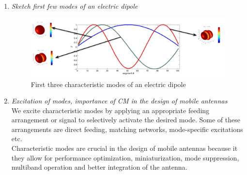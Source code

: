 \documentclass[11pt,a4paper]{article}
\begin{document}
\begin{enumerate}
    \item \emph{Sketch first few modes of an electric dipole}
    \begin{figure}[!ht]
        \centering
        \includegraphics[width=.9\textwidth]{src/characteristic-modes-dipole.png}
        \caption{\label{fig:characteristic-modes-dipole}First three characteristic modes of an electric dipole}
    \end{figure}
    \item \emph{Excitation of modes, importance of CM in the design of mobile antennas}\\
    We excite characteristic modes by applying an appropriate feeding arrangement or signal to selectively activate the desired mode. Some of these arrangements are direct feeding, matching networks, mode-specific excitations etc.\\
    Characteristic modes are crucial in the design of mobile antennas because it they allow for performance optimization, miniaturization, mode suppression, multiband operation and better integration of the antenna.

\end{enumerate}

\end{document}
